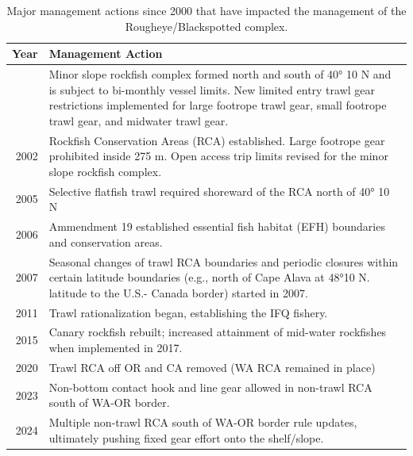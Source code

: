 \documentclass[
]{scrartcl}
\begin{document}
\begin{longtable}{r>{\raggedright\arraybackslash}p{\dimexpr 300.00pt -2\tabcolsep-1.5\arrayrulewidth}}

\caption{\label{tbl-management_summary}Major management actions since
2000 that have impacted the management of the Rougheye/Blackspotted
complex.}

\tabularnewline

\toprule
Year & Management Action \\ 
\midrule\addlinespace[2.5pt]
2000 & Minor slope rockfish complex formed north and south of 40° 10 N and is subject to bi-monthly vessel limits. New limited entry trawl gear restrictions implemented for large footrope trawl gear, small footrope trawl gear, and midwater trawl gear. \\ 
2002 & Rockfish Conservation Areas (RCA) established. Large footrope gear prohibited inside 275 m. Open access trip limits revised for the minor slope rockfish complex. \\ 
2005 & Selective flatfish trawl required shoreward of the RCA north of 40° 10 N \\ 
2006 & Ammendment 19 established essential fish habitat (EFH) boundaries and conservation areas. \\ 
2007 & Seasonal changes of trawl RCA boundaries and periodic closures within certain latitude boundaries (e.g., north of Cape Alava at 48°10 N. latitude to the U.S.- Canada border) started in 2007. \\ 
2011 & Trawl rationalization began, establishing the IFQ fishery. \\ 
2015 & Canary rockfish rebuilt; increased attainment of mid-water rockfishes when implemented in 2017.  \\ 
2020 & Trawl RCA off OR and CA removed (WA RCA remained in place) \\ 
2023 & Non-bottom contact hook and line gear allowed in non-trawl RCA south of WA-OR border. \\ 
2024 & Multiple non-trawl RCA south of WA-OR border rule updates, ultimately pushing fixed gear effort onto the shelf/slope.  \\ 
\bottomrule

\end{longtable}

\endgroup

\pagebreak
\end{document}
